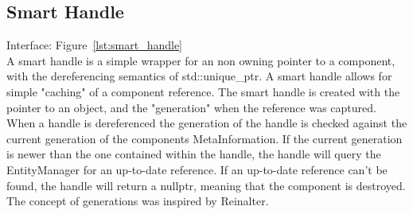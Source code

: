 \subsection{Smart Handle}
Interface: Figure~\ref{lst:smart_handle}\\\noindent
A smart handle is a simple wrapper for an non owning pointer to a component, with the dereferencing semantics of std::unique\_ptr. 
A smart handle allows for simple "caching" of a component reference.
The smart handle is created with the pointer to an object, 
and the "generation" when the reference was captured. 
When a handle is dereferenced the generation of the handle is checked against the current generation of the components MetaInformation. 
If the current generation is newer than the one contained within the handle, 
the handle will query the EntityManager for an up-to-date reference.
If an up-to-date reference can't be found, 
the handle will return a nullptr, meaning that the component is destroyed.
The concept of generations was inspired by Reinalter\cite{molecular_musings_internal_references}.
